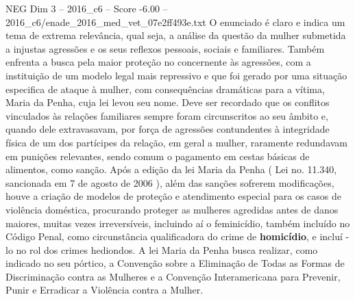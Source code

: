 \begin{textsample}{NEG Dim 3 – 2016\_c6 – Score -6.00 – 2016\_c6/enade\_2016\_med\_vet\_07e2ff493e.txt}
O enunciado é claro e indica um tema de extrema relevância, qual seja, a análise da questão da mulher submetida a injustas agressões e os seus reflexos pessoais, sociais e familiares.
Também enfrenta a busca pela maior proteção no concernente às agressões, com a instituição de um modelo legal mais repressivo e que foi gerado por uma situação especifica de ataque à mulher, com consequências dramáticas para a vítima, Maria da Penha, cuja lei levou seu nome.
Deve ser recordado que os conflitos vinculados às relações familiares sempre foram circunscritos ao seu âmbito e, quando dele extravasavam, por força de agressões contundentes à integridade física de um dos partícipes da relação, em geral a mulher, raramente redundavam em punições relevantes, sendo comum o pagamento em cestas básicas de alimentos, como sanção.
Após a edição da lei Maria da Penha ( Lei no. 11.340, sancionada em 7 de agosto de 2006 ), além das sanções sofrerem modificações, houve a criação de modelos de proteção e atendimento especial para os casos de violência doméstica, procurando proteger as mulheres agredidas antes de danos maiores, muitas vezes irreversíveis, incluindo aí o feminicídio, também incluído no Código Penal, como circunstância qualificadora do crime de \textbf{homicídio}, e incluí -lo no rol dos crimes hediondos.
A lei Maria da Penha busca realizar, como indicado no seu pórtico, a Convenção sobre a Eliminação de Todas as Formas de Discriminação contra as Mulheres e a Convenção Interamericana para Prevenir, Punir e Erradicar a Violência contra a Mulher.

\end{textsample}
